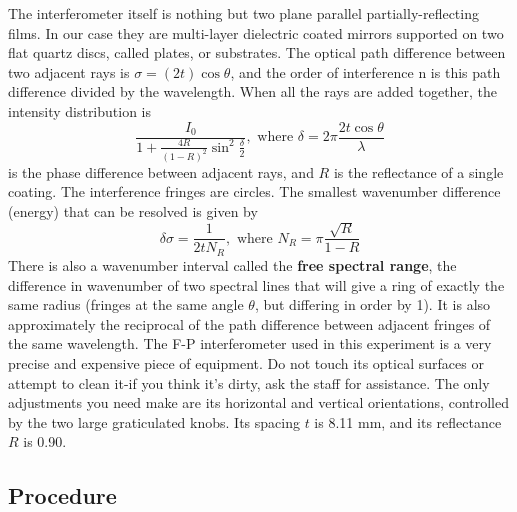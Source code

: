 \documentclass{../lab}
\begin{document}
\begin{enumerate}
    The interferometer itself is nothing but two plane parallel partially-reflecting films. In our case they are multi-layer dielectric coated mirrors supported on two flat quartz discs, called plates, or substrates. The optical path difference between two adjacent rays is $\sigma=(2t)\cos\theta $, and the order of interference n is this path difference divided by the wavelength. When all the rays are added together, the intensity distribution is
    \[
    \frac{I_0}{1+\frac{4R}{(1-R)^2}\sin^2\frac{\delta}{2}},
    \textrm{ where }
    \delta = 2 \pi \frac{2t \cos\theta}{\lambda}
    \]
    is the phase difference between adjacent rays, and $R$ is the reflectance of a single coating. The interference fringes are circles. The smallest wavenumber difference (energy) that can be resolved is given by
    \[
    \delta\sigma = \frac{1}{2 t N_R},
    \textrm{ where }
    N_R = \pi \frac{\sqrt{R}}{1-R}
    \]
    There is also a wavenumber interval called the \textbf{free spectral range}, the difference in wavenumber of two spectral lines that will give a ring of exactly the same radius (fringes at the same angle $\theta$, but differing in order by 1).  It is also approximately the reciprocal of the path difference between adjacent fringes of the same wavelength. The F-P interferometer used in this experiment is a very precise and expensive piece of equipment. Do not touch its optical surfaces or attempt to clean it-if you think it's dirty, ask the staff for assistance. The only adjustments you need make are its horizontal and vertical orientations, controlled by the two large graticulated knobs. Its spacing $t$ is 8.11 mm, and its reflectance $R$ is 0.90.

\end{enumerate}

\subsection{Procedure}
\end{document}
